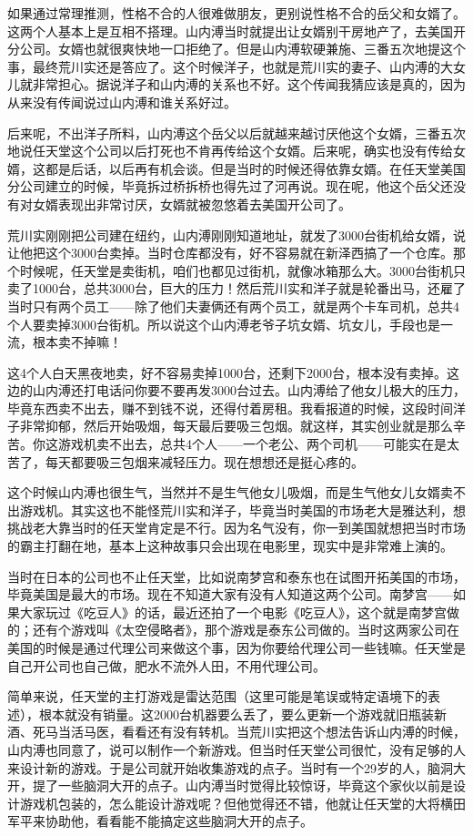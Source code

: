 \documentclass[
  letterpaper,
  DIV=11,
  numbers=noendperiod]{scrreprt}
\begin{document}
如果通过常理推测，性格不合的人很难做朋友，更别说性格不合的岳父和女婿了。这两个人基本上是互相不搭理。山内溥当时就提出让女婿别干房地产了，去美国开分公司。女婿也就很爽快地一口拒绝了。但是山内溥软硬兼施、三番五次地提这个事，最终荒川实还是答应了。这个时候洋子，也就是荒川实的妻子、山内溥的大女儿就非常担心。据说洋子和山内溥的关系也不好。这个传闻我猜应该是真的，因为从来没有传闻说过山内溥和谁关系好过。

后来呢，不出洋子所料，山内溥这个岳父以后就越来越讨厌他这个女婿，三番五次地说任天堂这个公司以后打死也不肯再传给这个女婿。后来呢，确实也没有传给女婿，这都是后话，以后再有机会谈。但是当时的时候还得依靠女婿。在任天堂美国分公司建立的时候，毕竟拆过桥拆桥也得先过了河再说。现在呢，他这个岳父还没有对女婿表现出非常讨厌，女婿就被忽悠着去美国开公司了。

荒川实刚刚把公司建在纽约，山内溥刚刚知道地址，就发了3000台街机给女婿，说让他把这个3000台卖掉。当时仓库都没有，好不容易就在新泽西搞了一个仓库。那个时候呢，任天堂是卖街机，咱们也都见过街机，就像冰箱那么大。3000台街机只卖了1000台，总共3000台，巨大的压力！然后荒川实和洋子就是轮番出马，还雇了当时只有两个员工------除了他们夫妻俩还有两个员工，就是两个卡车司机，总共4个人要卖掉3000台街机。所以说这个山内溥老爷子坑女婿、坑女儿，手段也是一流，根本卖不掉嘛！

这4个人白天黑夜地卖，好不容易卖掉1000台，还剩下2000台，根本没有卖掉。这边的山内溥还打电话问你要不要再发3000台过去。山内溥给了他女儿极大的压力，毕竟东西卖不出去，赚不到钱不说，还得付着房租。我看报道的时候，这段时间洋子非常抑郁，然后开始吸烟，每天最后要吸三包烟。就这样，其实创业就是那么辛苦。你这游戏机卖不出去，总共4个人------一个老公、两个司机------可能实在是太苦了，每天都要吸三包烟来减轻压力。现在想想还是挺心疼的。

这个时候山内溥也很生气，当然并不是生气他女儿吸烟，而是生气他女儿女婿卖不出游戏机。其实这也不能怪荒川实和洋子，毕竟当时美国的市场老大是雅达利，想挑战老大靠当时的任天堂肯定是不行。因为名气没有，你一到美国就想把当时市场的霸主打翻在地，基本上这种故事只会出现在电影里，现实中是非常难上演的。

当时在日本的公司也不止任天堂，比如说南梦宫和泰东也在试图开拓美国的市场，毕竟美国是最大的市场。现在不知道大家有没有人知道这两个公司。南梦宫------如果大家玩过《吃豆人》的话，最近还拍了一个电影《吃豆人》，这个就是南梦宫做的；还有个游戏叫《太空侵略者》，那个游戏是泰东公司做的。当时这两家公司在美国的时候是通过代理公司来做这个事，因为你要给代理公司一些钱嘛。任天堂是自己开公司也自己做，肥水不流外人田，不用代理公司。

简单来说，任天堂的主打游戏是雷达范围（这里可能是笔误或特定语境下的表述），根本就没有销量。这2000台机器要么丢了，要么更新一个游戏就旧瓶装新酒、死马当活马医，看看还有没有转机。当荒川实把这个想法告诉山内溥的时候，山内溥也同意了，说可以制作一个新游戏。但当时任天堂公司很忙，没有足够的人来设计新的游戏。于是公司就开始收集游戏的点子。当时有一个29岁的人，脑洞大开，提了一些脑洞大开的点子。山内溥当时觉得比较惊讶，毕竟这个家伙以前是设计游戏机包装的，怎么能设计游戏呢？但他觉得还不错，他就让任天堂的大将横田军平来协助他，看看能不能搞定这些脑洞大开的点子。
\end{document}

